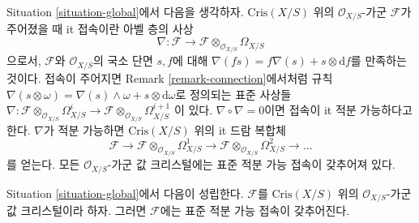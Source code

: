 \noindent
Situation \ref{situation-global}에서 다음을 생각하자.
$\text{Cris}(X/S)$ 위의 $\mathcal{O}_{X/S}$-가군
$\mathcal{F}$가 주어졌을 때 {it 접속}이란 아벨 층의 사상
$$
\nabla :
\mathcal{F}
\longrightarrow
\mathcal{F} \otimes_{\mathcal{O}_{X/S}} \Omega_{X/S}
$$
으로서, $\mathcal{F}$와 $\mathcal{O}_{X/S}$의 국소 단면 $s, f$에
대해 $\nabla(f s) = f\nabla(s) + s \otimes \text{d}f$를 만족하는
것이다. 접속이 주어지면 Remark \ref{remark-connection}에서처럼
규칙 $\nabla(s \otimes \omega) =
\nabla(s) \wedge \omega + s \otimes \text{d}\omega$로 정의되는
표준 사상들
$
\nabla :
\mathcal{F} \otimes_{\mathcal{O}_{X/S}} \Omega^i_{X/S}
\longrightarrow
\mathcal{F} \otimes_{\mathcal{O}_{X/S}} \Omega^{i + 1}_{X/S}
$
이 있다. $\nabla \circ \nabla = 0$이면 접속이
{it 적분 가능}하다고 한다. $\nabla$가 적분 가능하면
$\text{Cris}(X/S)$ 위의 {it 드람 복합체}
$$
\mathcal{F} \to
\mathcal{F} \otimes_{\mathcal{O}_{X/S}} \Omega^1_{X/S} \to
\mathcal{F} \otimes_{\mathcal{O}_{X/S}} \Omega^2_{X/S} \to \ldots
$$
를 얻는다. 모든 $\mathcal{O}_{X/S}$-가군 값 크리스털에는 표준
적분 가능 접속이 갖추어져 있다.

\begin{lemma}
\label{lemma-automatic-connection}
Situation \ref{situation-global}에서 다음이 성립한다.
$\mathcal{F}$를 $\text{Cris}(X/S)$ 위의
$\mathcal{O}_{X/S}$-가군 값 크리스털이라 하자. 그러면
$\mathcal{F}$에는 표준 적분 가능 접속이 갖추어진다.
\end{lemma}

